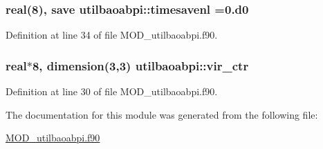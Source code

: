 \hypertarget{classutilbaoabpi_a22e7f67ae4c1ea38f973f74a6630d52a}{
\subsubsection[{timesavenl}]{\setlength{\rightskip}{0pt plus 5cm}real(8), save utilbaoabpi\-::timesavenl =0.d0}}\label{classutilbaoabpi_a22e7f67ae4c1ea38f973f74a6630d52a}


Definition at line 34 of file M\-O\-D\-\_\-utilbaoabpi.\-f90.

\hypertarget{classutilbaoabpi_a0771b4015356ff89c136bdbe85d441c4}{
\subsubsection[{vir\-\_\-ctr}]{\setlength{\rightskip}{0pt plus 5cm}real$\ast$8, dimension(3,3) utilbaoabpi\-::vir\-\_\-ctr}}\label{classutilbaoabpi_a0771b4015356ff89c136bdbe85d441c4}


Definition at line 30 of file M\-O\-D\-\_\-utilbaoabpi.\-f90.



The documentation for this module was generated from the following file\-:\begin{DoxyCompactItemize}
\item 
\hyperlink{MOD__utilbaoabpi_8f90}{M\-O\-D\-\_\-utilbaoabpi.\-f90}\end{DoxyCompactItemize}
